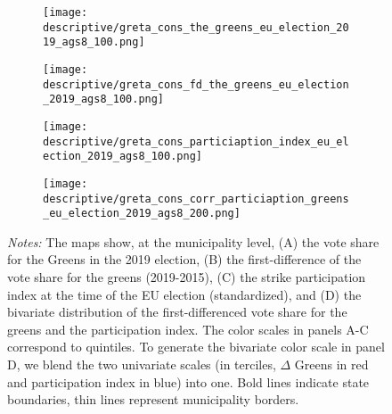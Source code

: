 \begin{figure}[H]\centering
	\caption{Spatial correlation of the vote share of the Greens and strike participation}
	\label{fig_greta_cons:spatial_correlation_greens_index}
	\begin{subfigure}[h]{0.45\linewidth}\centering
		\texttt{[image: descriptive/greta\_cons\_the\_greens\_eu\_election\_2019\_ags8\_100.png]}
	\end{subfigure}
	\begin{subfigure}[h]{0.45\linewidth}\centering
		\texttt{[image: descriptive/greta\_cons\_fd\_the\_greens\_eu\_election\_2019\_ags8\_100.png]}
	\end{subfigure}
	\begin{subfigure}[h]{0.45\linewidth}\centering
		\texttt{[image: descriptive/greta\_cons\_particiaption\_index\_eu\_election\_2019\_ags8\_100.png]}
	\end{subfigure}
	\begin{subfigure}[h]{0.45\linewidth}\centering
		\texttt{[image: descriptive/greta\_cons\_corr\_particiaption\_greens\_eu\_election\_2019\_ags8\_200.png]}
	\end{subfigure}

	\begin{minipage}{0.9\linewidth}
		\scriptsize{\emph{Notes:} The maps show, at the municipality level, (A) the vote share for the Greens in the 2019 election, (B) the first-difference of the vote share for the greens (2019-2015), (C) the strike participation index at the time of the EU election (standardized), and (D) the bivariate distribution of the first-differenced vote share for the greens and the participation index. The color scales in panels A-C correspond to quintiles. To generate the bivariate color scale in panel D, we blend the two univariate scales (in terciles, $\Delta$ Greens in red and participation index in blue) into one. Bold lines indicate state boundaries, thin lines represent municipality borders.}
	\end{minipage}
\end{figure}





